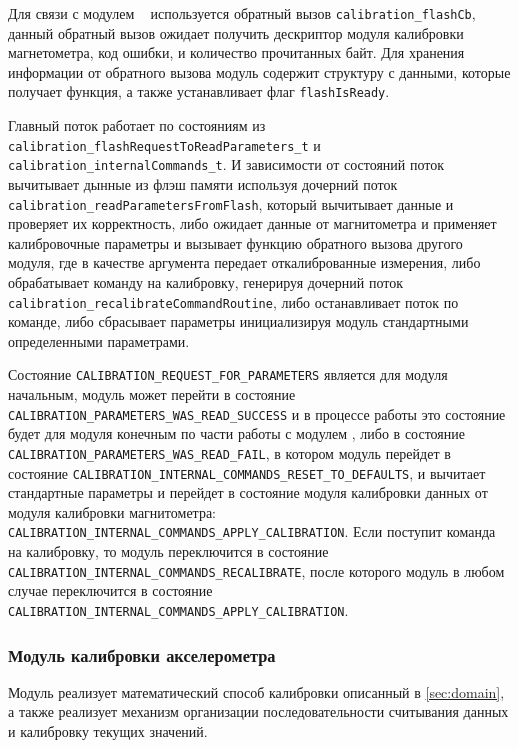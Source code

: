Для связи с модулем \moduleFlashMemory~ используется обратный вызов \lstinline{calibration_flashCb}, данный обратный вызов ожидает получить дескриптор модуля калибровки магнетометра, код ошибки,
и количество прочитанных байт. Для хранения информации от обратного вызова модуль содержит структуру с данными, которые получает функция, а также устанавливает флаг \lstinline{flashIsReady}.

Главный поток работает по состояниям из \lstinline{calibration_flashRequestToReadParameters_t} и \lstinline{calibration_internalCommands_t}. И зависимости от состояний
поток вычитывает дынные из флэш памяти используя дочерний поток \lstinline{calibration_readParametersFromFlash}, который вычитывает данные и проверяет их корректность,
либо ожидает данные от магнитометра и применяет калибровочные параметры и вызывает функцию обратного вызова другого модуля, где в качестве аргумента передает откалиброванные измерения,
либо обрабатывает команду на калибровку, генерируя дочерний поток \lstinline{calibration_recalibrateCommandRoutine}, либо останавливает поток по команде, либо сбрасывает параметры инициализируя модуль
стандартными определенными параметрами.

Состояние \lstinline{CALIBRATION_REQUEST_FOR_PARAMETERS} является для модуля начальным, модуль может перейти в состояние \lstinline{CALIBRATION_PARAMETERS_WAS_READ_SUCCESS} и в процессе работы это состояние
будет для модуля конечным по части работы с модулем \moduleFlashMemory, либо в состояние \lstinline{CALIBRATION_PARAMETERS_WAS_READ_FAIL},
в котором модуль перейдет в состояние \lstinline{CALIBRATION_INTERNAL_COMMANDS_RESET_TO_DEFAULTS}, и вычитает стандартные
параметры и перейдет в состояние модуля калибровки данных от модуля калибровки магнитометра: \lstinline{CALIBRATION_INTERNAL_COMMANDS_APPLY_CALIBRATION}.
Если поступит команда на калибровку, то модуль переключится в состояние \lstinline{CALIBRATION_INTERNAL_COMMANDS_RECALIBRATE}, после которого модуль в любом случае переключится в состояние
\lstinline{CALIBRATION_INTERNAL_COMMANDS_APPLY_CALIBRATION}.

\subsubsection{Модуль калибровки акселерометра}

Модуль реализует математический способ калибровки описанный в \ref{sec:domain}, а также реализует механизм организации последовательности считывания данных и калибровку
текущих значений. 

